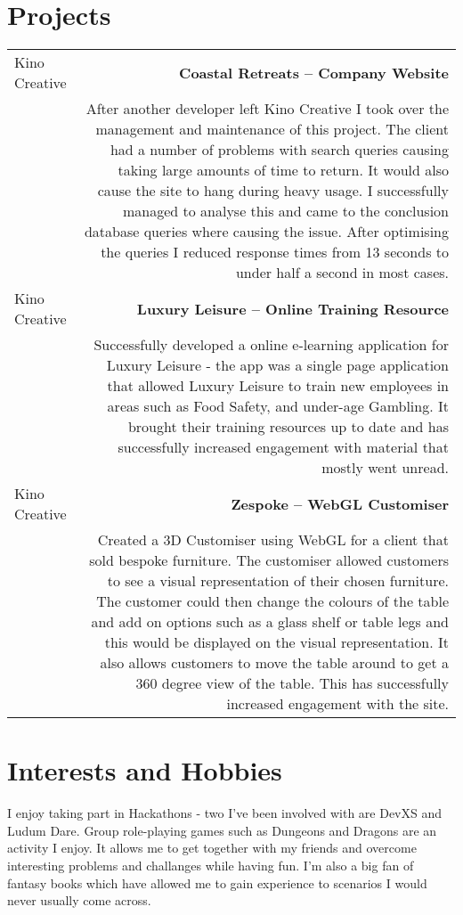 \documentclass[10pt]{article}
\begin{document}
\section*{Projects}
\begin{tabular}{L!{\VRule}R}
Kino Creative&{\bf Coastal Retreats -- Company Website}\\
&After another developer left Kino Creative I took over the management and maintenance of this project. The client had a number of problems with search queries causing taking large amounts of time to return. It would also cause the site to hang during heavy usage. I successfully managed to analyse this and came to the conclusion database queries where causing the issue. After optimising the queries I reduced response times from 13 seconds to under half a second in most cases.\\
Kino Creative&{\bf Luxury Leisure -- Online Training Resource}\\
&Successfully developed a online e-learning application for Luxury Leisure - the app was a single page application that allowed Luxury Leisure to train new employees in areas such as Food Safety, and under-age Gambling. It brought their training resources up to date and has successfully increased engagement with material that mostly went unread.\\
Kino Creative&{\bf Zespoke -- WebGL Customiser}\\
&Created a 3D Customiser using WebGL for a client that sold bespoke furniture. The customiser allowed customers to see a visual representation of their chosen furniture. The customer could then change the colours of the table and add on options such as a glass shelf or table legs and this would be displayed on the visual representation. It also allows customers to move the table around to get a 360 degree view of the table. This has successfully increased engagement with the site.\\
\end{tabular}

\section*{Interests and Hobbies}
I enjoy taking part in Hackathons - two I've been involved with are DevXS and Ludum Dare. Group role-playing games such as Dungeons and Dragons are an activity I enjoy. It allows me to get together with my friends and overcome interesting problems and challanges while having fun. I'm also a big fan of fantasy books which have allowed me to gain experience to scenarios I would never usually come across.
\end{document}
